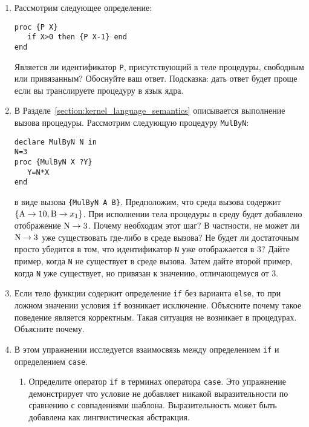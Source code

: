 \begin{enumerate}

  \item{Рассмотрим следующее определение:

    \begin{lstlisting}
proc {P X}
   if X>0 then {P X-1} end
end
    \end{lstlisting}

    Является ли идентификатор \lstinline!P!, присутствующий в теле процедуры, свободным или привязанным? Обоснуйте ваш ответ. Подсказка: дать ответ будет проще если вы транслируете процедуру в язык ядра.}

\item{В Разделе~\ref{section:kernel_language_semantics} описывается выполнение вызова процедуры. Рассмотрим следующую процедуру \lstinline!MulByN!:

  \begin{lstlisting}
declare MulByN N in
N=3
proc {MulByN X ?Y}
   Y=N*X
end
  \end{lstlisting}
  
в виде вызова \lstinline!{MulByN A B}!. Предположим, что среда вызова содержит $\{\text{\lstinline!A!} \to 10, \text{\lstinline!B!} \to x_1\}$. При исполнении тела процедуры в среду будет добавлено отображение $\text{\lstinline!N!} \to 3$. Почему необходим этот шаг? В частности, не может ли $\text{\lstinline!N!} \to 3$ уже существовать где-либо в среде вызова? Не будет ли достаточным просто убедится в том, что идентификатор \lstinline!N! уже отображается в 3? Дайте пример, когда \lstinline!N! не существует в среде вызова. Затем дайте второй пример, когда \lstinline!N! уже существует, но привязан к значению, отличающемуся от 3.}

\item{Если тело функции содержит определение \lstinline!if! без варианта \lstinline!else!, то при ложном значении условия \lstinline!if! возникает исключение. Объясните почему такое поведение является корректным. Такая ситуация не возникает в процедурах. Объясните почему.}

\item{В этом упражнении исследуется взаимосвязь между определением \lstinline!if! и определением \lstinline!case!.

  \begin{enumerate}
\item{Определите оператор \lstinline!if! в терминах оператора \lstinline!case!. Это упражнение демонстрирует что условие не добавляет никакой выразительности по сравнению с совпадениями шаблона. Выразительность может быть добавлена как лингвистическая абстракция.}


\end{enumerate}}
\end{enumerate}
